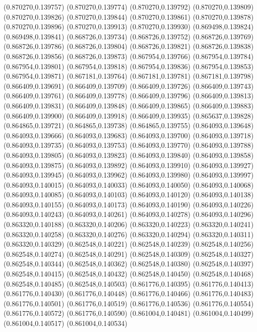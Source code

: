(0.870270,0.139757)
(0.870270,0.139774)
(0.870270,0.139792)
(0.870270,0.139809)
(0.870270,0.139826)
(0.870270,0.139844)
(0.870270,0.139861)
(0.870270,0.139878)
(0.870270,0.139896)
(0.870270,0.139913)
(0.870270,0.139930)
(0.869498,0.139824)
(0.869498,0.139841)
(0.868726,0.139734)
(0.868726,0.139752)
(0.868726,0.139769)
(0.868726,0.139786)
(0.868726,0.139804)
(0.868726,0.139821)
(0.868726,0.139838)
(0.868726,0.139856)
(0.868726,0.139873)
(0.867954,0.139766)
(0.867954,0.139784)
(0.867954,0.139801)
(0.867954,0.139818)
(0.867954,0.139836)
(0.867954,0.139853)
(0.867954,0.139871)
(0.867181,0.139764)
(0.867181,0.139781)
(0.867181,0.139798)
(0.866409,0.139691)
(0.866409,0.139709)
(0.866409,0.139726)
(0.866409,0.139743)
(0.866409,0.139761)
(0.866409,0.139778)
(0.866409,0.139796)
(0.866409,0.139813)
(0.866409,0.139831)
(0.866409,0.139848)
(0.866409,0.139865)
(0.866409,0.139883)
(0.866409,0.139900)
(0.866409,0.139918)
(0.866409,0.139935)
(0.865637,0.139828)
(0.864865,0.139721)
(0.864865,0.139738)
(0.864865,0.139755)
(0.864093,0.139648)
(0.864093,0.139666)
(0.864093,0.139683)
(0.864093,0.139700)
(0.864093,0.139718)
(0.864093,0.139735)
(0.864093,0.139753)
(0.864093,0.139770)
(0.864093,0.139788)
(0.864093,0.139805)
(0.864093,0.139823)
(0.864093,0.139840)
(0.864093,0.139858)
(0.864093,0.139875)
(0.864093,0.139892)
(0.864093,0.139910)
(0.864093,0.139927)
(0.864093,0.139945)
(0.864093,0.139962)
(0.864093,0.139980)
(0.864093,0.139997)
(0.864093,0.140015)
(0.864093,0.140033)
(0.864093,0.140050)
(0.864093,0.140068)
(0.864093,0.140085)
(0.864093,0.140103)
(0.864093,0.140120)
(0.864093,0.140138)
(0.864093,0.140155)
(0.864093,0.140173)
(0.864093,0.140190)
(0.864093,0.140226)
(0.864093,0.140243)
(0.864093,0.140261)
(0.864093,0.140278)
(0.864093,0.140296)
(0.863320,0.140188)
(0.863320,0.140206)
(0.863320,0.140223)
(0.863320,0.140241)
(0.863320,0.140258)
(0.863320,0.140276)
(0.863320,0.140294)
(0.863320,0.140311)
(0.863320,0.140329)
(0.862548,0.140221)
(0.862548,0.140239)
(0.862548,0.140256)
(0.862548,0.140274)
(0.862548,0.140291)
(0.862548,0.140309)
(0.862548,0.140327)
(0.862548,0.140344)
(0.862548,0.140362)
(0.862548,0.140380)
(0.862548,0.140397)
(0.862548,0.140415)
(0.862548,0.140432)
(0.862548,0.140450)
(0.862548,0.140468)
(0.862548,0.140485)
(0.862548,0.140503)
(0.861776,0.140395)
(0.861776,0.140413)
(0.861776,0.140430)
(0.861776,0.140448)
(0.861776,0.140466)
(0.861776,0.140483)
(0.861776,0.140501)
(0.861776,0.140519)
(0.861776,0.140536)
(0.861776,0.140554)
(0.861776,0.140572)
(0.861776,0.140590)
(0.861004,0.140481)
(0.861004,0.140499)
(0.861004,0.140517)
(0.861004,0.140534)
